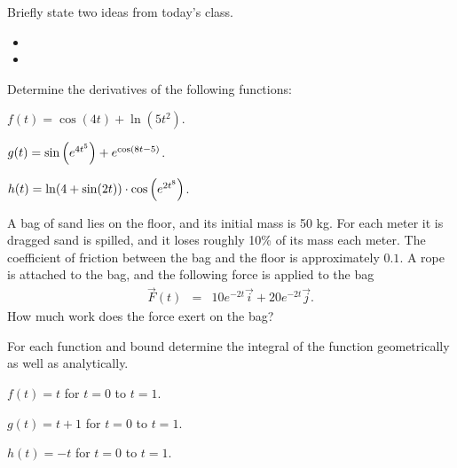\begin{problem}
\item Briefly state two ideas from today's class.
  \begin{itemize}
  \item
  \item
  \end{itemize}
\item Determine the derivatives of the following functions:
  \begin{subproblem}
  \item $f(t) = \cos(4t) + \ln(5t^2)$.
    \vfill
  \item $g(t) = \sin\left( e^{4t^5} \right)  + e^{\cos\left( 8t-5 \right)}$.
    \vfill
  \item $h(t) = \ln(4+\sin(2t) ) \cdot \cos \left( e^{2t^8} \right)$.
    \vfill
  \end{subproblem}

  \clearpage

\item A bag of sand lies on the floor, and its initial mass is 50
  kg. For each meter it is dragged sand is spilled, and it loses
  roughly 10\% of its mass each meter. The coefficient of friction
  between the bag and the floor is approximately $0.1$. A rope is
  attached to the bag, and the following force is applied to the bag
  \begin{eqnarray*}
    \vec{F}(t) & = & 10e^{-2t} \vec{i} + 20 e^{-2t} \vec{j}.
  \end{eqnarray*}
  How much work does the force exert on the bag?

  \vfill


\end{problem}


\begin{problem}
\item For each function and bound determine the integral of the
  function geometrically as well as analytically. 
  \begin{subproblem}
  \item $f(t)=t$ for $t=0$ to $t=1$.
    \vfill
  \item $g(t)=t+1$ for $t=0$ to $t=1$.
    \vfill
  \item $h(t)=-t$ for $t=0$ to $t=1$.
    \vfill
  \end{subproblem}
\end{problem}


